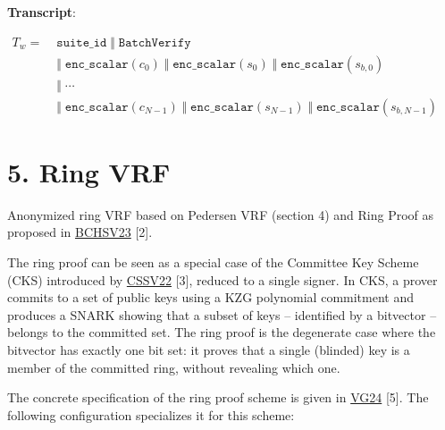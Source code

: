 \documentclass[
]{article}
\begin{document}
\textbf{Transcript}:

\(\begin{aligned}
T_w = &\; \texttt{suite\_id} \;\Vert\; \texttt{BatchVerify} \\
  &\; \Vert\; \texttt{enc\_scalar}(c_0) \;\Vert\; \texttt{enc\_scalar}(s_0) \;\Vert\; \texttt{enc\_scalar}(s_{b,0}) \\
  &\; \Vert\; \cdots \\
  &\; \Vert\; \texttt{enc\_scalar}(c_{N-1}) \;\Vert\; \texttt{enc\_scalar}(s_{N-1}) \;\Vert\; \texttt{enc\_scalar}(s_{b,N-1})
\end{aligned}\)

\section{5. Ring VRF}\label{ring-vrf}

Anonymized ring VRF based on Pedersen VRF (section 4) and Ring Proof as
proposed in \href{https://eprint.iacr.org/2023/002}{BCHSV23} {[}2{]}.

The ring proof can be seen as a special case of the Committee Key Scheme
(CKS) introduced by \href{https://eprint.iacr.org/2022/1205}{CSSV22}
{[}3{]}, reduced to a single signer. In CKS, a prover commits to a set
of public keys using a KZG polynomial commitment and produces a SNARK
showing that a subset of keys -- identified by a bitvector -- belongs to
the committed set. The ring proof is the degenerate case where the
bitvector has exactly one bit set: it proves that a single (blinded) key
is a member of the committed ring, without revealing which one.

The concrete specification of the ring proof scheme is given in
\href{https://github.com/davxy/ring-proof-spec}{VG24} {[}5{]}. The
following configuration specializes it for this scheme:
\end{document}
